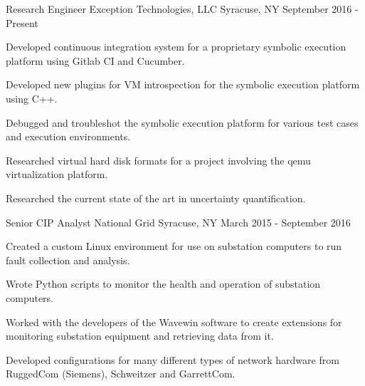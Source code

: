 

\begin{cventries}

  \cventry
    {Research Engineer} %
    {Exception Technologies, LLC} %
    {Syracuse, NY} %
    {September 2016 - Present} %
    {
      \begin{cvitems} %
      	\item {Developed continuous integration system for a proprietary symbolic execution platform using Gitlab CI and Cucumber.}
      	\item {Developed new plugins for VM introspection for the symbolic execution platform using C++.}
      	\item {Debugged and troubleshot the symbolic execution platform for various test cases and execution environments.}
      	\item {Researched virtual hard disk formats for a project involving the qemu virtualization platform.}
      	\item {Researched the current state of the art in uncertainty quantification.}
      \end{cvitems}
    }

  \cventry
    {Senior CIP Analyst} %
    {National Grid} %
    {Syracuse, NY} %
    {March 2015 - September 2016} %
    {
      \begin{cvitems} %
        \item {Created a custom Linux environment for use on substation computers to run fault collection and analysis.}
        \item {Wrote Python scripts to monitor the health and operation of substation computers.}
        \item {Worked with the developers of the Wavewin software to create extensions for monitoring substation equipment and retrieving data from it.}
        \item {Developed configurations for many different types of network hardware from RuggedCom (Siemens), Schweitzer and GarrettCom.}
      \end{cvitems}
    }


\end{cventries}
